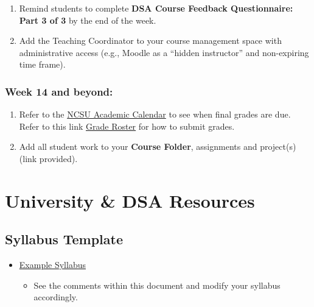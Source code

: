 \documentclass[
]{book}
\providecommand{\tightlist}{%
  \setlength{\itemsep}{0pt}\setlength{\parskip}{0pt}}
\begin{document}
\begin{enumerate}
\def\labelenumi{\arabic{enumi})}
\item
  Remind students to complete \textbf{DSA Course Feedback Questionnaire: Part 3 of 3} by the end of the week.
\item
  Add the Teaching Coordinator to your course management space with administrative access (e.g., Moodle as a ``hidden instructor'' and non-expiring time frame).
\end{enumerate}

\hypertarget{week-14-and-beyond}{%
\subsection{Week 14 and beyond:}\label{week-14-and-beyond}}

\begin{enumerate}
\def\labelenumi{\arabic{enumi})}
\item
  Refer to the \href{https://studentservices.ncsu.edu/calendars/academic/}{NCSU Academic Calendar} to see when final grades are due. Refer to this link \href{https://sis.emas.ncsu.edu/faculty/faculty-center/\#grades}{Grade Roster} for how to submit grades.
\item
  Add all student work to your \textbf{Course Folder}, assignments and project(s) (link provided).
\end{enumerate}

\hypertarget{university-dsa-resources}{%
\chapter{University \& DSA Resources}\label{university-dsa-resources}}

\hypertarget{syllabus-template}{%
\section{Syllabus Template}\label{syllabus-template}}

\begin{itemize}
\tightlist
\item
  \href{https://docs.google.com/document/d/12w-byO3kEmP4ofI8GIuDAbXkEOA3hwqVGXz3qRbX-l4/edit?usp=sharing}{Example Syllabus}

  \begin{itemize}
  \tightlist
  \item
    See the comments within this document and modify your syllabus accordingly.
  \end{itemize}
\end{itemize}
\end{document}
